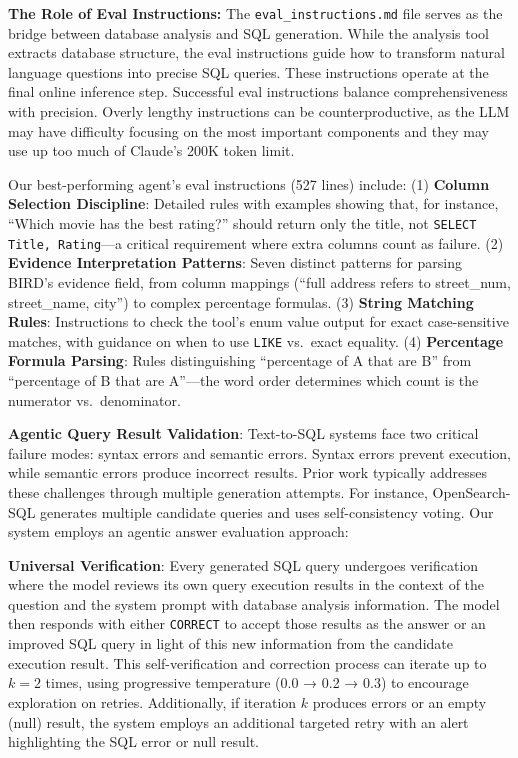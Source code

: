 \documentclass{article}
\begin{document}
\textbf{The Role of Eval Instructions:} The \texttt{eval\_instructions.md} file serves as the bridge between database analysis and SQL generation. While the analysis tool extracts database structure, the eval instructions guide how to transform natural language questions into precise SQL queries. These instructions operate at the final online inference step. Successful eval instructions balance comprehensiveness with precision.  Overly lengthy instructions can be counterproductive, as the LLM may have difficulty focusing on the most important components and they may use up too much of Claude's 200K token limit.

Our best-performing agent's eval instructions (527 lines) include: (1) \textbf{Column Selection Discipline}: Detailed rules with examples showing that, for instance, ``Which movie has the best rating?'' should return only the title, not \texttt{SELECT Title, Rating}---a critical requirement where extra columns count as failure. (2) \textbf{Evidence Interpretation Patterns}: Seven distinct patterns for parsing BIRD's evidence field, from column mappings (``full address refers to street\_num, street\_name, city'') to complex percentage formulas. (3) \textbf{String Matching Rules}: Instructions to check the tool's enum value output for exact case-sensitive matches, with guidance on when to use \texttt{LIKE} vs.\ exact equality. (4) \textbf{Percentage Formula Parsing}: Rules distinguishing ``percentage of A that are B'' from ``percentage of B that are A''---the word order determines which count is the numerator vs.\ denominator.

\textbf{Agentic Query Result Validation}: Text-to-SQL systems face two critical failure modes: syntax errors and semantic errors. Syntax errors prevent execution, while semantic errors produce incorrect results.  Prior work typically addresses these challenges through multiple generation attempts. For instance, OpenSearch-SQL \citep{opensearch2025} generates multiple candidate queries and uses self-consistency voting. Our system employs an agentic answer evaluation approach: 

\textbf{Universal Verification}: Every generated SQL query undergoes verification where the model reviews its own query execution results in the context of the question and the system prompt with database analysis information. The model then responds with either \texttt{CORRECT} to accept those results as the answer or an improved SQL query in light of this new information from the candidate execution result. This self-verification and correction process can iterate up to $k=2$ times, using progressive temperature (0.0 → 0.2 → 0.3) to encourage exploration on retries. Additionally, if iteration $k$ produces errors or an empty (null) result, the system employs an additional targeted retry with an alert highlighting the SQL error or null result.
\end{document}

